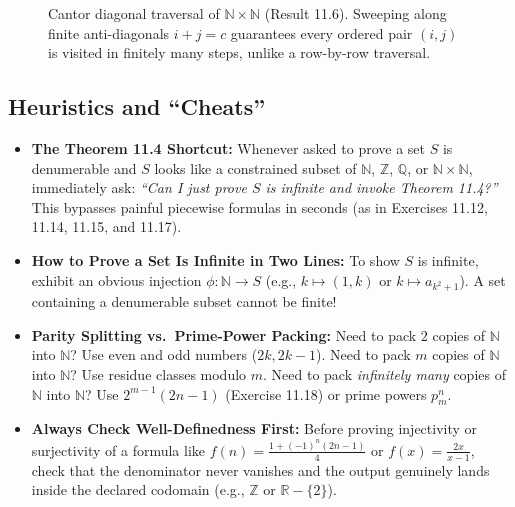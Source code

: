 \documentclass[11pt, letterpaper]{article}
\theoremstyle{definition}
\theoremstyle{remark}
\begin{document}
\begin{figure}[htbp]
\caption{Cantor diagonal traversal of $\mathbb{N} \times \mathbb{N}$ (Result 11.6). Sweeping along finite anti-diagonals $i + j = c$ guarantees every ordered pair $(i, j)$ is visited in finitely many steps, unlike a row-by-row traversal.}
\end{figure}

\subsection{Heuristics and ``Cheats''}

\begin{itemize}
    \item \textbf{The Theorem 11.4 Shortcut:} Whenever asked to prove a set $S$ is denumerable and $S$ looks like a constrained subset of $\mathbb{N}$, $\mathbb{Z}$, $\mathbb{Q}$, or $\mathbb{N} \times \mathbb{N}$, immediately ask: \emph{``Can I just prove $S$ is infinite and invoke Theorem 11.4?''} This bypasses painful piecewise formulas in seconds (as in Exercises 11.12, 11.14, 11.15, and 11.17).
    \item \textbf{How to Prove a Set Is Infinite in Two Lines:} To show $S$ is infinite, exhibit an obvious injection $\phi : \mathbb{N} \to S$ (e.g., $k \mapsto (1, k)$ or $k \mapsto a_{k^2 + 1}$). A set containing a denumerable subset cannot be finite!
    \item \textbf{Parity Splitting vs.\ Prime-Power Packing:} Need to pack $2$ copies of $\mathbb{N}$ into $\mathbb{N}$? Use even and odd numbers ($2k, 2k-1$). Need to pack $m$ copies of $\mathbb{N}$ into $\mathbb{N}$? Use residue classes modulo $m$. Need to pack \emph{infinitely many} copies of $\mathbb{N}$ into $\mathbb{N}$? Use $2^{m-1}(2n - 1)$ (Exercise 11.18) or prime powers $p_m^n$.
    \item \textbf{Always Check Well-Definedness First:} Before proving injectivity or surjectivity of a formula like $f(n) = \frac{1 + (-1)^n(2n-1)}{4}$ or $f(x) = \frac{2x}{x-1}$, check that the denominator never vanishes and the output genuinely lands inside the declared codomain (e.g., $\mathbb{Z}$ or $\mathbb{R} - \{2\}$).
\end{itemize}
\end{document}
